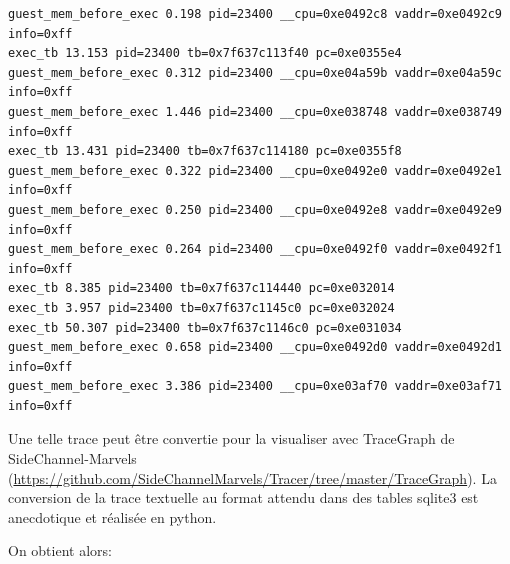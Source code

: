 \documentclass[14pt]{article}
\theoremstyle{definition}
\begin{document}
\begin{verbatim}
guest_mem_before_exec 0.198 pid=23400 __cpu=0xe0492c8 vaddr=0xe0492c9 info=0xff
exec_tb 13.153 pid=23400 tb=0x7f637c113f40 pc=0xe0355e4
guest_mem_before_exec 0.312 pid=23400 __cpu=0xe04a59b vaddr=0xe04a59c info=0xff
guest_mem_before_exec 1.446 pid=23400 __cpu=0xe038748 vaddr=0xe038749 info=0xff
exec_tb 13.431 pid=23400 tb=0x7f637c114180 pc=0xe0355f8
guest_mem_before_exec 0.322 pid=23400 __cpu=0xe0492e0 vaddr=0xe0492e1 info=0xff
guest_mem_before_exec 0.250 pid=23400 __cpu=0xe0492e8 vaddr=0xe0492e9 info=0xff
guest_mem_before_exec 0.264 pid=23400 __cpu=0xe0492f0 vaddr=0xe0492f1 info=0xff
exec_tb 8.385 pid=23400 tb=0x7f637c114440 pc=0xe032014
exec_tb 3.957 pid=23400 tb=0x7f637c1145c0 pc=0xe032024
exec_tb 50.307 pid=23400 tb=0x7f637c1146c0 pc=0xe031034
guest_mem_before_exec 0.658 pid=23400 __cpu=0xe0492d0 vaddr=0xe0492d1 info=0xff
guest_mem_before_exec 3.386 pid=23400 __cpu=0xe03af70 vaddr=0xe03af71 info=0xff
\end{verbatim}


Une telle trace peut être convertie pour la visualiser avec TraceGraph de SideChannel-Marvels (\url{https://github.com/SideChannelMarvels/Tracer/tree/master/TraceGraph}).
La conversion de la trace textuelle au format attendu dans des tables sqlite3 est anecdotique et réalisée en python.

On obtient alors:
\end{document}
